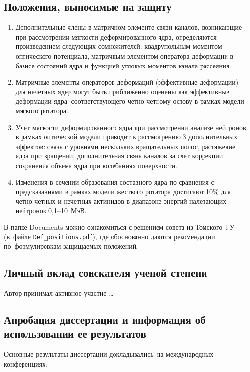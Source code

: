 \subsection*{Положения, выносимые на защиту}

\begin{enumerate}[beginpenalty=10000] %
	\item Дополнительные члены в матричном элементе связи каналов, возникающие при рассмотрении мягкости деформированного ядра, определяются произведением следующих сомножителей: квадрупольным моментом оптического потенциала, матричным элементом оператора деформации в базисе состояний ядра и функцией угловых моментов канала рассеяния.
	\item Матричные элементы операторов деформаций (эффективные деформации) для нечетных ядер могут быть приближенно оценены как эффективные деформации ядра, соответствующего четно-четному остову в рамках модели мягкого ротатора.
	\item Учет мягкости деформированного ядра при рассмотрении анализе нейтронов в рамках оптической модели приводит к рассмотрению 3 дополнительных эффектов: связь с уровнями нескольких вращательных полос, растяжение ядра при вращении, дополнительная связь каналов за счет коррекции сохранения объема ядра при колебаниях поверхности.
	\item Изменения в сечении образования составного ядра по сравнения с предсказаниями в рамках модели жесткого ротатора достигают 10\% для четно-четных и нечетных актинидов в диапазоне энергий налетающих нейтронов 0,1--10~МэВ.
\end{enumerate}
В папке Documents можно ознакомиться с решением совета из Томского~ГУ
(в~файле \verb+Def_positions.pdf+), где обоснованно даются рекомендации
по~формулировкам защищаемых положений.

\subsection*{Личный вклад соискателя ученой степени}

Автор принимал активное участие \ldots

\subsection*{Апробация диссертации и информация об использовании ее результатов}

Основные результаты диссертации докладывались~на международных конференциях:


